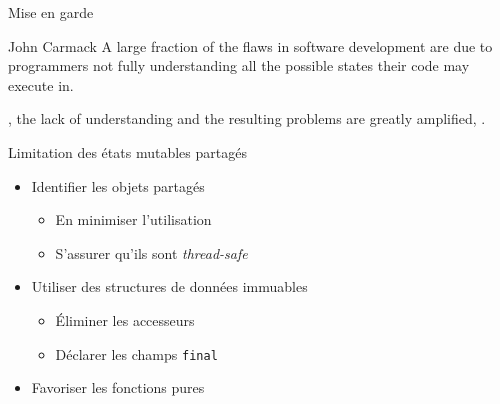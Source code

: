 
\begingroup

\begin{frame}{Mise en garde}
  \begin{shadequote}{John Carmack}
    A large fraction of the flaws in software development are due to programmers not fully understanding all the possible states their code may execute in.

    , the lack of understanding and the resulting problems are greatly amplified, .
  \end{shadequote}

  \begin{alertblock}{Limitation des états mutables partagés}
    \begin{itemize}
    \item Identifier les objets partagés
      \begin{itemize}
      \item En minimiser l'utilisation
      \item S'assurer qu'ils sont \textit{thread-safe}
      \end{itemize}
    \item Utiliser des structures de données immuables
      \begin{itemize}
      \item Éliminer les accesseurs
      \item Déclarer les champs \lstinline{final}
      \end{itemize}
    \item Favoriser les fonctions pures
    \end{itemize}
  \end{alertblock}        

\end{frame}

\endgroup
\endinput
